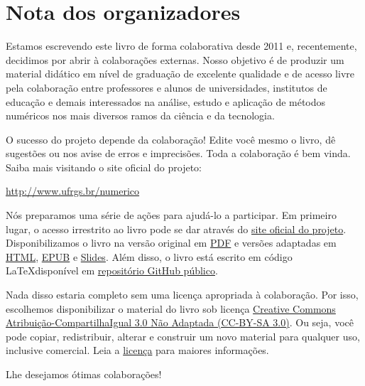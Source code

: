 
\chapter*{Nota dos organizadores}

Estamos escrevendo este livro de forma colaborativa desde 2011 e, recentemente, decidimos por abrir à colaborações externas. Nosso objetivo é de produzir um material didático em nível de graduação de excelente qualidade e de acesso livre pela colaboração entre professores e alunos de universidades, institutos de educação e demais interessados na análise, estudo e aplicação de métodos numéricos nos mais diversos ramos da ciência e da tecnologia.

O sucesso do projeto depende da colaboração! Edite você mesmo o livro, dê sugestões ou nos avise de erros e imprecisões. Toda a colaboração é bem vinda. Saiba mais visitando o site oficial do projeto:
\begin{center}
  \url{http://www.ufrgs.br/numerico}
\end{center}

Nós preparamos uma série de ações para ajudá-lo a participar. Em primeiro lugar, o acesso irrestrito ao livro pode se dar através do \href{http://www.ufrgs.br/numerico}{site oficial do projeto}. Disponibilizamos o livro na versão original em \href{https://github.com/livroscolaborativos/CalculoNumerico/blob/master/main.pdf}{PDF} e versões adaptadas em \href{http://www.ufrgs.br/numerico/book_in_webpage/main.html}{HTML}, \href{http://www.ufrgs.br/numerico/book_in_webpage/main.epub}{EPUB} e \href{http://www.ufrgs.br/numerico/book_in_webpage/slide.pdf}{Slides}. Além disso, o livro está escrito em código \LaTeX disponível em \href{https://github.com/livroscolaborativos/CalculoNumerico}{repositório GitHub público}. 

Nada disso estaria completo sem uma licença apropriada à colaboração. Por isso, escolhemos disponibilizar o material do livro sob licença \href{https://creativecommons.org/licenses/by-sa/3.0/}{Creative Commons Atribuição-CompartilhaIgual 3.0 Não Adaptada (CC-BY-SA 3.0)}. Ou seja, você pode copiar, redistribuir, alterar e construir um novo material para qualquer uso, inclusive comercial. Leia a \href{https://creativecommons.org/licenses/by-sa/3.0/}{licença} para maiores informações.

\vspace{0.5cm}

Lhe desejamos ótimas colaborações!

